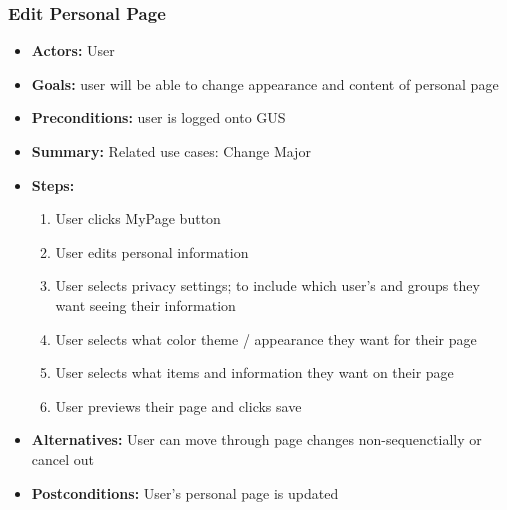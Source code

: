          \subsubsection{Edit Personal Page}
			\begin{itemize}
				\item{\textbf{Actors:} User}
				\item{\textbf{Goals:} user will be able to change appearance and content of personal page}
				\item{\textbf{Preconditions:} user is logged onto GUS}
				\item{\textbf{Summary:} Related use cases: Change Major}
				\item{\textbf{Steps:}
				\begin{enumerate}
					\item{User clicks MyPage button}
					\item{User edits personal information}
					\item{User selects privacy settings; to include which user's and groups they want seeing their information}
					\item{User selects what color theme / appearance they want for their page}
					\item{User selects what items and information they want on their page}
					\item{User previews their page and clicks save}
				\end{enumerate}
				}
				\item{\textbf{Alternatives:} User can move through page changes non-sequenctially or cancel out}
				\item{\textbf{Postconditions:} User's personal page is updated}
			\end{itemize}
